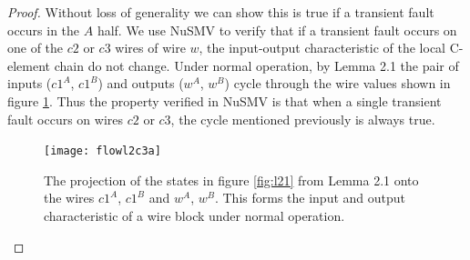 \documentclass[12pt]{report}
\begin{document}
\begin{proof}
Without loss of generality we can show this is true if a transient fault occurs in the $A$ half.  We use NuSMV to verify that if a transient fault occurs on one of the $c2$ or $c3$ wires of wire $w$, the input-output characteristic of the local C-element chain do not change.  Under normal operation, by Lemma 2.1 the pair of inputs ($c1^A$, $c1^B$) and outputs ($w^A$, $w^B$) cycle through the wire values shown in figure \ref{fig:l3helper}.  Thus the property verified in NuSMV is that when a single transient fault occurs on wires $c2$ or $c3$, the cycle mentioned previously is always true.    
\begin{figure}
  \centering
    \texttt{[image: flowl2c3a]}
  \caption{The projection of the states in figure \ref{fig:l21} from Lemma 2.1 onto the wires $c1^A$, $c1^B$ and $w^A$, $w^B$.  This forms the input and output characteristic of a wire block under normal operation.}
  \label{fig:l3helper}
\end{figure}


\end{proof}
\end{document}
